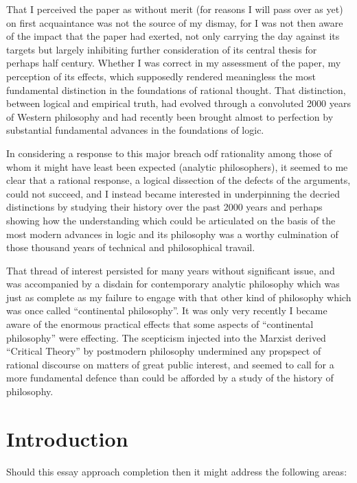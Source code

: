 \documentclass[10pt,titlepage]{book}
\begin{document}
That I perceived the paper as without merit (for reasons I will pass over as yet) on first acquaintance was not the source of my dismay, for I was not then aware of the impact that the paper had exerted, not only carrying the day against its targets but largely inhibiting further consideration of its central thesis for perhaps half century.
Whether I was correct in my assessment of the paper, my perception of its effects, which supposedly rendered meaningless the most fundamental distinction in the foundations of rational thought.
That distinction, between logical and empirical truth, had evolved through a convoluted 2000 years of Western philosophy and had recently been brought almost to perfection by substantial fundamental advances in the foundations of logic.

In considering a response to this major breach odf rationality among those of whom it might have least been expected (analytic philosophers), it seemed to me clear that a rational response, a logical dissection of the defects of the arguments, could not succeed, and I instead became interested in underpinning the decried distinctions by studying their history over the past 2000 years and perhaps showing how the understanding which could be articulated on the basis of the most modern advances in logic and its philosophy was a worthy culmination of those thousand years of technical and philosophical travail.

That thread of interest persisted for many years without significant issue, and was accompanied by a disdain for contemporary analytic philosophy which was just as complete as my failure to engage with that other kind of philosophy which was once called ``continental philosophy''.
It was only very recently I became aware of the enormous practical effects that some aspects of ``continental philosophy'' were effecting.
The scepticism injected into the Marxist derived ``Critical Theory'' by postmodern philosophy undermined any propspect of rational discourse on matters of great public interest, and seemed to call for a more fundamental defence than could be afforded by a study of the history of philosophy.


\section{Introduction}

Should this essay approach completion then it might address the following areas:
\end{document}
